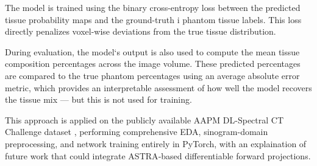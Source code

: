 The model is trained using the binary cross-entropy loss between the predicted tissue probability maps and the ground-truth i
phantom tissue labels. This loss directly penalizes voxel-wise deviations from the true tissue distribution.

During evaluation, the model`s output is also used to compute the mean tissue composition percentages across the image volume. 
These predicted percentages are compared to the true phantom percentages using an average absolute error metric, which provides 
an interpretable assessment of how well the model recovers the tissue mix — but this is not used for training.

This approach is applied on the publicly available AAPM DL-Spectral CT Challenge dataset \cite{AAPM2024SpectralCT},  performing 
comprehensive EDA, sinogram-domain preprocessing, and network training entirely in PyTorch, with an explaination of future work 
that could integrate ASTRA‐based differentiable forward projections.
